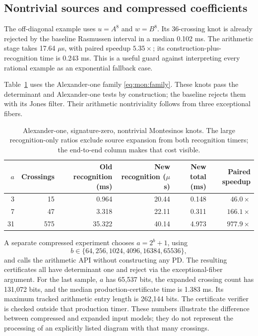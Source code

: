 \subsection{Nontrivial sources and compressed coefficients}

The off-diagonal example uses \(u=A^8\) and \(w=B^8\). Its 36-crossing
knot is already rejected by the baseline Rasmussen interval in a median
0.102 ms. The arithmetic stage takes 17.64 \(\mu\)s, with paired
speedup \(5.35\times\); its construction-plus-recognition time is
0.243 ms. This is a useful guard against interpreting every rational
example as an exponential fallback case.

Table~\ref{tab:pretzel-benchmarks} uses the Alexander-one family
\eqref{eq:mon:family}. These knots pass the determinant and Alexander-one
tests by construction; the baseline rejects them with its Jones filter.
Their arithmetic nontriviality follows from three exceptional fibers.

\begin{table}[htbp]
\centering\small
\begin{tabular}{rrrrrr}
\toprule
\(a\) & Crossings & Old recognition (ms) & New recognition (\(\mu\)s) &
New total (ms) & Paired speedup\\
\midrule
3 & 15 & 0.964 & 20.44 & 0.148 & \(46.0\times\)\\
7 & 47 & 3.318 & 22.11 & 0.311 & \(166.1\times\)\\
31 & 575 & 35.322 & 40.14 & 4.973 & \(977.9\times\)\\
\bottomrule
\end{tabular}
\caption{Alexander-one, signature-zero, nontrivial Montesinos knots.
The large recognition-only ratios exclude source expansion from both
recognition timers; the end-to-end column makes that cost visible.}
\label{tab:pretzel-benchmarks}
\end{table}

A separate compressed experiment chooses \(a=2^b+1\), using
\[b\in\{64,256,1024,4096,16384,65536\},\]
and calls the arithmetic API
without constructing any PD. The resulting certificates all have
determinant one and reject via the exceptional-fiber argument.
For the last sample, \(a\) has 65,537 bits, the expanded crossing count
has 131,072 bits, and the median production-certificate time is
1.383 ms. Its maximum tracked arithmetic entry length is 262,144 bits.
The certificate verifier is checked outside that production timer.
These numbers illustrate the difference between compressed and expanded
input models; they do not represent the processing of an explicitly
listed diagram with that many crossings.

